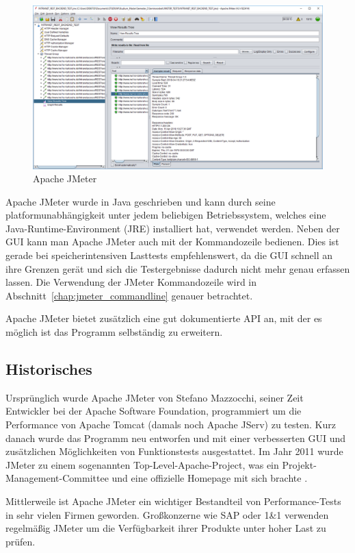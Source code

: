 \documentclass[a4paper,12pt]{article}
\begin{document}
\begin{figure}[htb]%
 \centering
    \includegraphics[width=1\textwidth]{bilder/jmeter_1.png}
  \caption{Apache JMeter}
  \label{fig:jmeter_gui}
\end{figure}
Apache JMeter wurde in Java geschrieben und kann durch seine platformunabhängigkeit unter jedem beliebigen Betriebssystem, welches eine Java-Runtime-Environment (JRE) installiert hat, verwendet werden. Neben der GUI kann man Apache JMeter auch mit der Kommandozeile bedienen. Dies ist gerade bei speicherintensiven Lasttests empfehlenswert, da die GUI schnell an ihre Grenzen gerät und sich die Testergebnisse dadurch nicht mehr genau erfassen lassen. Die Verwendung der JMeter Kommandozeile wird in Abschnitt~\ref{chap:jmeter_commandline} genauer betrachtet.

Apache JMeter bietet zusätzlich eine gut dokumentierte API an, mit der es möglich ist das Programm selbständig zu erweitern.

\subsection{Historisches}
Ursprünglich wurde Apache JMeter von Stefano Mazzocchi, seiner Zeit Entwickler bei der Apache Software Foundation, programmiert um die Performance von Apache Tomcat (damals noch Apache JServ) zu testen. Kurz danach wurde das Programm neu entworfen und mit einer verbesserten GUI und zusätzlichen Möglichkeiten von Funktionstests ausgestattet. Im Jahr 2011 wurde JMeter zu einem sogenannten Top-Level-Apache-Project, was ein Projekt-Management-Committee und eine offizielle Homepage mit sich brachte \cite{online:officialJMeter}.

Mittlerweile ist Apache JMeter ein wichtiger Bestandteil von Performance-Tests in sehr vielen Firmen geworden. Großkonzerne wie SAP oder 1\&1 verwenden regelmäßig JMeter um die Verfügbarkeit ihrer Produkte unter hoher Last zu prüfen. 
\end{document}
